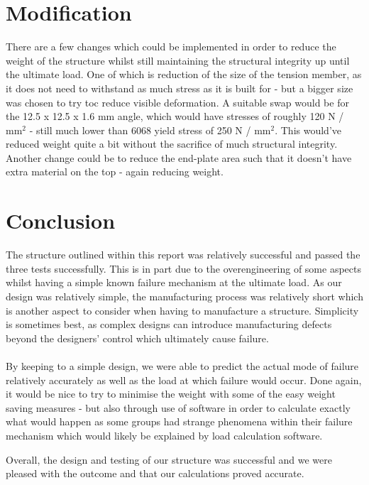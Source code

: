 \documentclass[12pt]{article}
\begin{document}
    \section{Modification}
        There are a few changes which could be implemented in order to reduce the weight of the structure whilst still maintaining the structural integrity up until the ultimate load.
        One of which is reduction of the size of the tension member, as it does not need to withstand as much stress as it is built for - but a bigger size was chosen to try toc
        reduce visible deformation. A suitable swap would be for the 12.5 x 12.5 x 1.6 mm angle, which would have stresses of roughly 120 N / mm$^2$ - still much lower than 6068 yield stress of
        250 N / mm$^2$. This would've reduced weight quite a bit without the sacrifice of much structural integrity. Another change could be to reduce the end-plate area such that
        it doesn't have extra material on the top - again reducing weight.
    \section{Conclusion}
        The structure outlined within this report was relatively successful and passed the three tests successfully. This is in part due to the overengineering of some aspects whilst
        having a simple known failure mechanism at the ultimate load. As our design was relatively simple, the manufacturing process was relatively short which is another aspect to consider
        when having to manufacture a structure. Simplicity is sometimes best, as complex designs can introduce manufacturing defects beyond the designers' control which ultimately cause failure. \\ \\


        By keeping to a simple design, we were able to predict the actual mode of failure relatively accurately as well as the load at which failure would occur. Done again, it would be nice to
        try to minimise the weight with some of the easy weight saving measures - but also through use of software in order to calculate exactly what would happen as some groups
        had strange phenomena within their failure mechanism which would likely be explained by load calculation software.

        Overall, the design and testing of our structure was successful and we were pleased with the outcome and that our calculations proved accurate.
\end{document}

